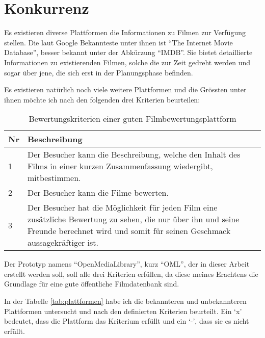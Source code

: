 \section{Konkurrenz}
Es existieren diverse Plattformen die Informationen zu Filmen zur Verfügung stellen.
Die laut Google \cite{movie_informations} Bekannteste unter ihnen ist ``The Internet Movie Database'',
besser bekannt unter der Abkürzung ``IMDB''. Sie bietet detaillierte Informationen
zu existierenden Filmen, solche die zur Zeit gedreht werden und sogar über jene, die
sich erst in der Planungsphase befinden.

Es existieren natürlich noch viele weitere Plattformen und die Grössten unter 
ihnen möchte ich nach den folgenden drei Kriterien beurteilen:

\begin{table}[h]
\begin{center}
    \begin{tabular}{lp{12cm}l}
        \toprule Nr & Beschreibung \\
        \midrule 1 & Der Besucher kann die Beschreibung, welche den Inhalt 
                     des Films in einer kurzen Zusammenfassung wiedergibt, mitbestimmen. \\
        \midrule 2 & Der Besucher kann die Filme bewerten. \\
        \midrule 3 & Der Besucher hat die Möglichkeit für jeden Film eine zusätzliche
                     Bewertung zu sehen, die nur über ihn und seine Freunde berechnet
                     wird und somit für seinen Geschmack aussagekräftiger ist. \\
        \bottomrule
    \end{tabular}
    \caption{Bewertungskriterien einer guten Filmbewertungsplattform}
    \label{tab:bewertungskriterien}
\end{center}
\end{table}

Der Prototyp namens ``OpenMediaLibrary'', kurz ``OML'', der in dieser Arbeit erstellt werden soll, 
soll alle drei Kriterien erfüllen, da diese meines Erachtens die Grundlage für eine gute 
öffentliche Filmdatenbank sind.

In der Tabelle \ref{tab:plattformen} habe ich die bekannteren und unbekannteren 
Plattformen untersucht und nach den definierten Kriterien beurteilt. Ein `x' bedeutet,
dass die Plattform das Kriterium erfüllt und ein `-', dass sie es nicht erfüllt.

